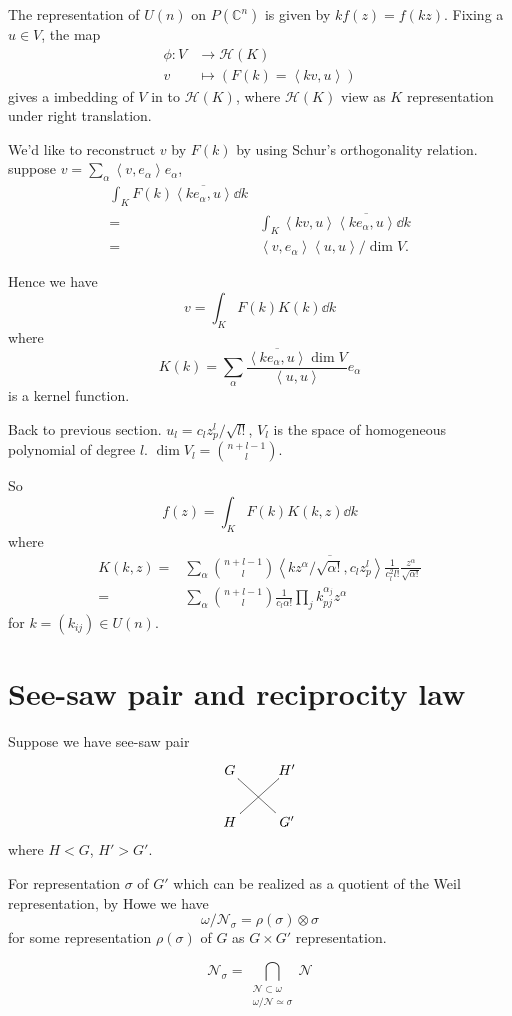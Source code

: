 \documentclass[12pt]{article}
\def\bC{{\mathbb{C}}}
\def\sH{\mathcal{H}}
\def\inn#1#2{\left\langle{#1},{#2}\right\rangle}
\def\cnn{\mathcal{N}}
\begin{document}
The representation of $U(n)$ on $P(\bC^n)$ is given by  $k f(z)  =f(kz)$. 
Fixing a $u\in V$, the map 
\begin{align*}
\phi\colon V &\to  \sH(K)\\
v & \mapsto (F(k)=\inn{kv}{u})
\end{align*}
gives a imbedding of $V$ in to $\sH(K)$, 
where $\sH(K)$ view as $K$ representation under right translation.

We'd like to reconstruct $v$ by $F(k)$ by using Schur's orthogonality relation. 
suppose $v = \sum_{\alpha} \inn{v}{e_\alpha} e_\alpha$, 
\[
\begin{split}
\int_K F(k) \overline{\inn{ke_\alpha}{u}} \dd k \\
= &\int_K  \inn{kv}{u}\overline{\inn{ke_\alpha}{u}}\dd k\\
= &\inn{v}{e_\alpha}\inn{u}{u}/\dim V.
\end{split}
\]

Hence we have 
\[
v = \int_K F(k) K(k) \dd k
\]
where 
\[
K(k) = \sum_{\alpha} \frac{\overline{\inn{ke_\alpha}{u}}\dim V}{\inn{u}{u}} e_\alpha 
\]
is a kernel function. 

Back to previous section. $u_l = c_l z_p^l/\sqrt{l!}$, $V_l$ is the space of homogeneous polynomial of degree $l$.
$\dim V_l  = \binom{n+l-1}{l}$.
   
So 
\[
f(z) = \int_K F(k) K(k,z) \dd k 
\]
where 
\[
\begin{split}
K(k,z) =& \sum_{\alpha} \binom{n+l-1}{l} 
\overline{\inn{k z^\alpha/\sqrt{\alpha!}}{c_lz_p^l}}\frac{1}{c_l^2l!}
\frac{z^\alpha}{\sqrt{\alpha!}}\\
= & \sum_\alpha \binom{n+l-1}{l}\frac{1}{c_l \alpha!}
\prod_j k_{pj}^{\alpha_j} z^\alpha
\end{split}
\]
for $k = (k_{ij}) \in U(n)$. 

\section{See-saw pair and reciprocity law}
Suppose we have see-saw pair
\[
\xymatrix{G \ar@{-}[dr] & H'\\
H\ar@{-}[ur] & G'
}
\]
where $H < G$, $H'> G'$. 

For representation $\sigma$ of $G'$ which can be realized as a quotient of
the Weil representation, by Howe we have
\[
 \omega/\cnn_\sigma= \rho(\sigma)\otimes \sigma
\]
for some representation $\rho(\sigma)$ of $G$ as $G\times G'$ representation.

\[
\cnn_\sigma = \bigcap_{\substack{\cnn\subset \omega\\ \omega/\cnn\simeq \sigma}}\cnn
\]
\end{document}
